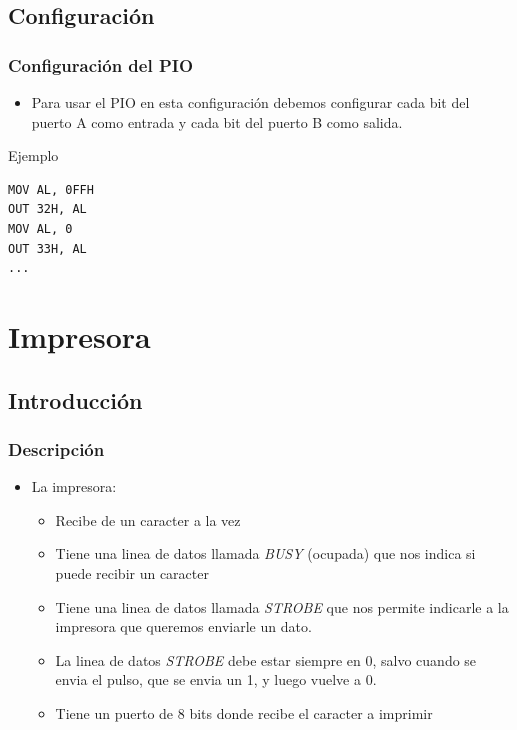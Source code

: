 \documentclass{beamer}
\begin{document}
\subsection{Configuración}
\begin{frame}[fragile]
\frametitle{Configuración del PIO}
\begin{itemize}
  \item Para usar el PIO en esta configuración debemos configurar cada bit del puerto A como entrada y cada bit del puerto B como salida.
\end{itemize}

\begin{block}{Ejemplo}
\begin{verbatim}
MOV AL, 0FFH
OUT 32H, AL
MOV AL, 0
OUT 33H, AL
...
\end{verbatim}

\end{block}

\end{frame}


\section{Impresora}
\subsection{Introducción}
\begin{frame}
\frametitle{Descripción}
\begin{itemize}
  \item La impresora:
  \begin{itemize}
      \item Recibe de un caracter a la vez
      \item Tiene una linea de datos llamada \emph{BUSY} (ocupada) que nos indica si puede recibir un caracter
      \item Tiene una linea de datos llamada \emph{STROBE} que nos permite indicarle a la impresora que queremos enviarle un dato.
      \item La linea de datos \emph{STROBE} debe estar siempre en 0, salvo cuando se envia el pulso, que se envia un 1, y luego vuelve a 0.
      \item Tiene un puerto de 8 bits donde recibe el caracter a imprimir
  \end{itemize}
\end{itemize}
\end{frame}
\end{document}
